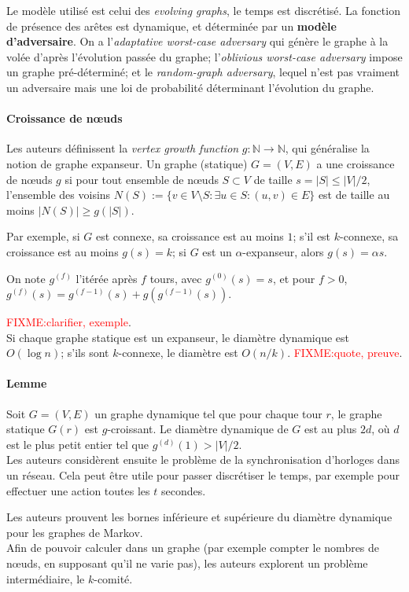 \documentclass[12pt,a4paper]{article}
\begin{document}
Le modèle utilisé est celui des \textit{evolving graphs}, le temps est
discrétisé. La fonction de présence des arêtes est dynamique, et
déterminée par un \textbf{modèle d'adversaire}. On a
l'\textit{adaptative worst-case adversary} qui génère le graphe à la
volée d'après l'évolution passée du graphe; l'\textit{oblivious
  worst-case adversary} impose un graphe pré-déterminé; et le
\textit{random-graph adversary}, lequel n'est pas vraiment un
adversaire mais une loi de probabilité déterminant l'évolution du
graphe.

\paragraph{Croissance de nœuds} Les auteurs définissent la \textit{vertex
  growth function} \(g : \mathbb{N} \to \mathbb{N}\), qui généralise
la notion de graphe expanseur. Un graphe (statique) \(G = (V, E)\) a
une croissance de nœuds \(g\) si pour tout ensemble de nœuds \(S
\subset V\) de taille \(s = |S| \leq |V|/2\), l'ensemble des voisins
\(N(S) := \{v \in V \setminus S : \exists u \in S : (u, v) \in E\}\)
est de taille au moins \(|N(S)| \geq g(|S|)\).

Par exemple, si \(G\) est connexe, sa croissance est au moins \(1\);
s'il est \(k\)-connexe, sa croissance est au moins \(g(s) = k\); si
\(G\) est un \(\alpha\)-expanseur, alors \(g(s) = \alpha s\).

On note \(g^{(f)}\) l'itérée après \(f\) tours, avec
\(g^{(0)}(s) = s\), et pour \(f > 0\),
\(g^{(f)}(s) = g^{(f-1)}(s) + g(g^{(f-1)}(s))\).

\textcolor{red}{FIXME:\@ clarifier, exemple}.\\

Si chaque graphe statique est un expanseur, le diamètre dynamique est
\(O(\log n)\); s'ils sont \(k\)-connexe, le diamètre est \(O(n/k)\).
\textcolor{red}{FIXME:\@ quote, preuve}.

\paragraph{Lemme} Soit \(G = (V, E)\) un graphe dynamique tel que pour
chaque tour \(r\), le graphe statique \(G(r)\) est \(g\)-croissant. Le
diamètre dynamique de \(G\) est au plus \(2d\), où \(d\) est le plus
petit entier tel que \(g^{(d)}(1) > |V|/2\).\\

Les auteurs considèrent ensuite le problème de la synchronisation
d'horloges dans un réseau. Cela peut être utile pour passer
discrétiser le temps, par exemple pour effectuer une action toutes les
\(t\) secondes.

Les auteurs prouvent les bornes inférieure et supérieure du
diamètre dynamique pour les graphes de Markov.\\

Afin de pouvoir calculer dans un graphe (par exemple compter le
nombres de nœuds, en supposant qu'il ne varie pas), les auteurs
explorent un problème intermédiaire, le \(k\)-comité.

\printbibliography{}
\end{document}
